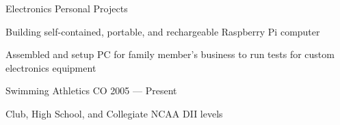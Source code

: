 \begin{cventries}
  \cventry
    {Electronics} %
    {Personal Projects} %
    {} %
    {} %
    {
      \begin{cvitems} %
        \item {Building self-contained, portable, and rechargeable Raspberry Pi computer}
        \item {Assembled and setup PC for family member's business to run tests for custom electronics equipment}
      \end{cvitems}
   }

 \cventry
    {Swimming} %
    {Athletics} %
    {CO} %
    {2005 --- Present} %
    {
      \begin{cvitems} %
        \item {Club, High School, and Collegiate NCAA DII levels}
      \end{cvitems}
   }

\end{cventries}

